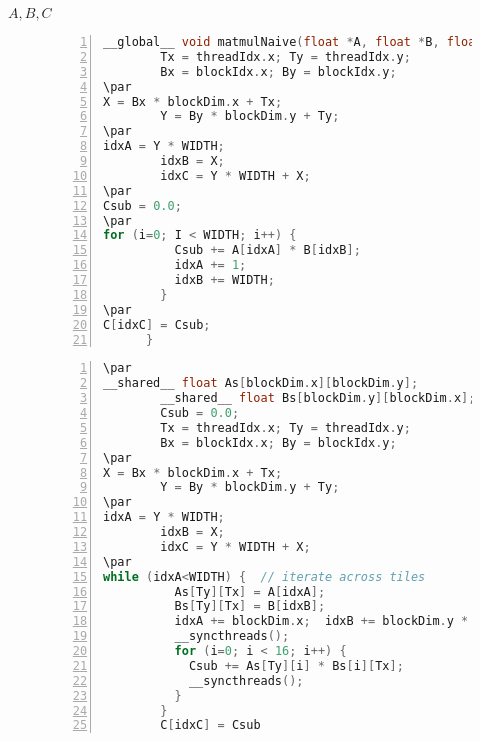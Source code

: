 {{\begin{table}
\end{table}%
\lthtmlfigureZ
\lthtmlcheckvsize\clearpage}

{\newpage\clearpage
{}%
$ A, B, C$%
\lthtmlinlinemathZ
\lthtmlcheckvsize\clearpage}

{\newpage\clearpage
{}%
\begin{figure}  \centering
    \begin{lstlisting}[numbers=left, language=C, numberstyle=\tiny , numbersep=8pt]
      __global__ void matmulNaive(float *A, float *B, float *C, int WIDTH){
        Tx = threadIdx.x; Ty = threadIdx.y;
        Bx = blockIdx.x; By = blockIdx.y;
\par
X = Bx * blockDim.x + Tx;
        Y = By * blockDim.y + Ty;
\par
idxA = Y * WIDTH;   
        idxB = X;
        idxC = Y * WIDTH + X;
\par
Csub = 0.0;
\par
for (i=0; I < WIDTH; i++) {
          Csub += A[idxA] * B[idxB];
          idxA += 1;
          idxB += WIDTH;
        }
\par
C[idxC] = Csub;
      }
    \end{lstlisting}
  
\end{figure}%
\lthtmlfigureZ
\lthtmlcheckvsize\clearpage}

{\newpage\clearpage
{}%
\begin{figure}  \centering
    \begin{lstlisting}[numbers=left, language=C, numberstyle=\tiny , numbersep=8pt]
\par
__shared__ float As[blockDim.x][blockDim.y];
        __shared__ float Bs[blockDim.y][blockDim.x];
        Csub = 0.0;
        Tx = threadIdx.x; Ty = threadIdx.y;
        Bx = blockIdx.x; By = blockIdx.y;
\par
X = Bx * blockDim.x + Tx;
        Y = By * blockDim.y + Ty;
\par
idxA = Y * WIDTH;   
        idxB = X;
        idxC = Y * WIDTH + X;
\par
while (idxA<WIDTH) {  // iterate across tiles
          As[Ty][Tx] = A[idxA];
          Bs[Ty][Tx] = B[idxB];
          idxA += blockDim.x;  idxB += blockDim.y * WIDTH;
          __syncthreads();
          for (i=0; i < 16; i++) {
            Csub += As[Ty][i] * Bs[i][Tx];
            __syncthreads();
          }
        }
        C[idxC] = Csub
    \end{lstlisting}
  

\end{figure}}}
